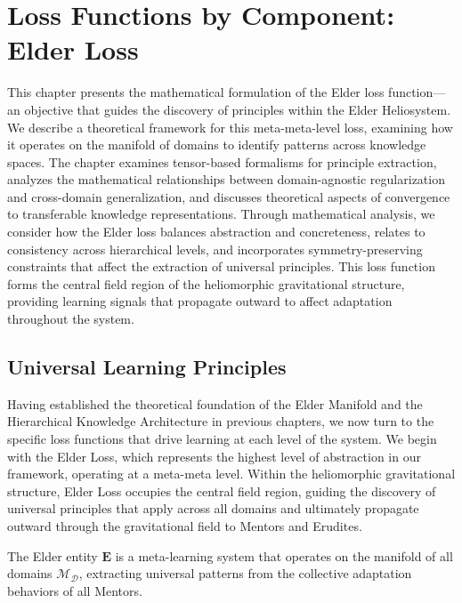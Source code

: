 \chapter{Loss Functions by Component: Elder Loss}

\begin{tcolorbox}[colback=PureBlue!5!white,colframe=PureBlue!75!black,title=Chapter Summary]
This chapter presents the mathematical formulation of the Elder loss function—an objective that guides the discovery of principles within the Elder Heliosystem. We describe a theoretical framework for this meta-meta-level loss, examining how it operates on the manifold of domains to identify patterns across knowledge spaces. The chapter examines tensor-based formalisms for principle extraction, analyzes the mathematical relationships between domain-agnostic regularization and cross-domain generalization, and discusses theoretical aspects of convergence to transferable knowledge representations. Through mathematical analysis, we consider how the Elder loss balances abstraction and concreteness, relates to consistency across hierarchical levels, and incorporates symmetry-preserving constraints that affect the extraction of universal principles. This loss function forms the central field region of the heliomorphic gravitational structure, providing learning signals that propagate outward to affect adaptation throughout the system.
\end{tcolorbox}

\section{Universal Learning Principles}

Having established the theoretical foundation of the Elder Manifold and the Hierarchical Knowledge Architecture in previous chapters, we now turn to the specific loss functions that drive learning at each level of the system. We begin with the Elder Loss, which represents the highest level of abstraction in our framework, operating at a meta-meta level. Within the heliomorphic gravitational structure, Elder Loss occupies the central field region, guiding the discovery of universal principles that apply across all domains and ultimately propagate outward through the gravitational field to Mentors and Erudites.

\begin{definition}
The Elder entity $\textbf{E}$ is a meta-learning system that operates on the manifold of all domains $\mathcal{M}_{\mathcal{D}}$, extracting universal patterns from the collective adaptation behaviors of all Mentors.
\end{definition}

